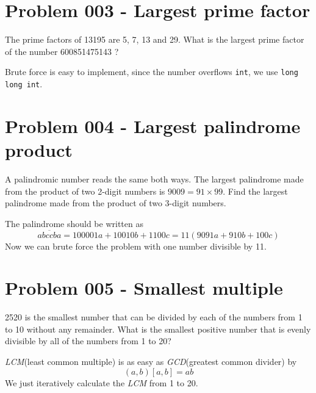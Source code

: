\section{Problem 003 - Largest prime factor}
\begin{prob}
The prime factors of 13195 are 5, 7, 13 and 29.
What is the largest prime factor of the number 600851475143 ?
\end{prob}
\begin{sol}
Brute force is easy to implement, since the number overflows \texttt{int}, we use \texttt{long long int}. 
\end{sol}

\section{Problem 004 - Largest palindrome product}
\begin{prob}	
A palindromic number reads the same both ways. The largest palindrome made from the product of two 2-digit numbers is $9009 = 91 \times 99$.
Find the largest palindrome made from the product of two 3-digit numbers.
\end{prob}
\begin{sol}
The palindrome should be written as
\begin{equation}
\overline{abccba} = 100001 a + 10010 b + 1100 c = 11(9091 a + 910 b + 100 c)
\end{equation}
Now we can brute force the problem with one number divisible by 11.
\end{sol}

\section{Problem 005 - Smallest multiple}
\begin{prob}
2520 is the smallest number that can be divided by each of the numbers from 1 to 10 without any remainder.
What is the smallest positive number that is evenly divisible by all of the numbers from 1 to 20?
\end{prob}

\begin{sol}
\emph{LCM}(least common multiple) is as easy as \emph{GCD}(greatest common divider) by 
\begin{equation}
(a, b)[a, b] = ab
\end{equation}
We just iteratively calculate the \emph{LCM} from 1 to 20.
\end{sol}

